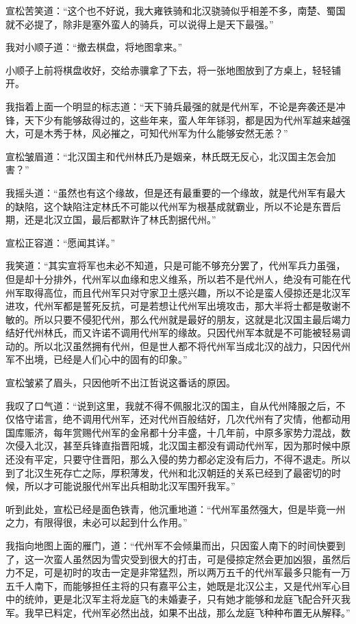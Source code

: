 宣松苦笑道：“这个也不好说，我大雍铁骑和北汉骁骑似乎相差不多，南楚、蜀国就不必提了，除非是塞外蛮人的骑兵，可以说得上是天下最强。”

我对小顺子道：“撤去棋盘，将地图拿来。”

小顺子上前将棋盘收好，交给赤骥拿了下去，将一张地图放到了方桌上，轻轻铺开。

我指着上面一个明显的标志道：“天下骑兵最强的就是代州军，不论是奔袭还是冲锋，天下少有能够敌得过的，这些年来，蛮人年年铩羽，都是因为代州军越来越强大，可是木秀于林，风必摧之，可知代州军为什么能够安然无恙？”

宣松皱眉道：“北汉国主和代州林氏乃是姻亲，林氏既无反心，北汉国主怎会加害？”

我摇头道：“虽然也有这个缘故，但是还有最重要的一个缘故，就是代州军有最大的缺陷，这个缺陷注定林氏不可能以代州军为根基成就霸业，所以不论是东晋后期，还是北汉立国，最后都默许了林氏割据代州。”

宣松正容道：“愿闻其详。”

我笑道：“其实宣将军也未必不知道，只是可能不够充分罢了，代州军兵力虽强，但是却十分排外，代州军以血缘和忠义维系，所以若不是代州人，绝没有可能在代州军取得高位，而且代州军只对守家卫土感兴趣，所以不论是蛮人侵掠还是北汉军进攻，代州军都是誓死反抗，可是若想让代州军出境攻击，那大半将士都是敬谢不敏的。所以只要不侵犯代州，那么代州就是最好的朋友，这就是北汉国主最后竭力结好代州林氏，而又许诺不调用代州军的缘故。只因代州军本就是不可能被轻易调动的。所以北汉虽然拥有代州，但是世人都不将代州军当成北汉的战力，只因代州军不出境，已经是人们心中的固有的印象。”

宣松皱紧了眉头，只因他听不出江哲说这番话的原因。

我叹了口气道：“说到这里，我就不得不佩服北汉的国主，自从代州降服之后，不仅恪守诺言，绝不调用代州军，还对代州百般结好，几次代州有了灾情，他都动用国库赈济，每年赏赐代州军的金帛都十分丰盛，十几年前，中原多家势力混战，数次侵入北汉，甚至兵锋直指晋阳城，北汉国主都没有调动代州军，因为那时候中原还没有平定，只要守住晋阳，那么入侵的势力都必定没有后力，不得不退走。所以到了北汉生死存亡之际，厚积薄发，代州和北汉朝廷的关系已经到了最密切的时候，所以才可能说服代州军出兵相助北汉军围歼我军。”

听到此处，宣松已经是面色铁青，他沉重地道：“代州军虽然强大，但是毕竟一州之力，有限得很，未必可以起到什么作用。”

我指向地图上面的雁门，道：“代州军不会倾巢而出，只因蛮人南下的时间快要到了，这一次蛮人虽然因为雪灾受到很大的打击，可是侵掠定然会更加凶狠，虽然后力不足，可是初时的攻击一定是非常猛烈，所以两万五千的代州军最多只能有一万五千人南下，而能够担任主将的只有嘉平公主，她既是北汉公主，又是代州军心目中的统帅，更是北汉军主将龙庭飞的未婚妻子，只有她才能够和龙庭飞配合歼灭我军。我早已料定，代州军必然出战，如果不出战，那么龙庭飞种种布置无从解释。”

